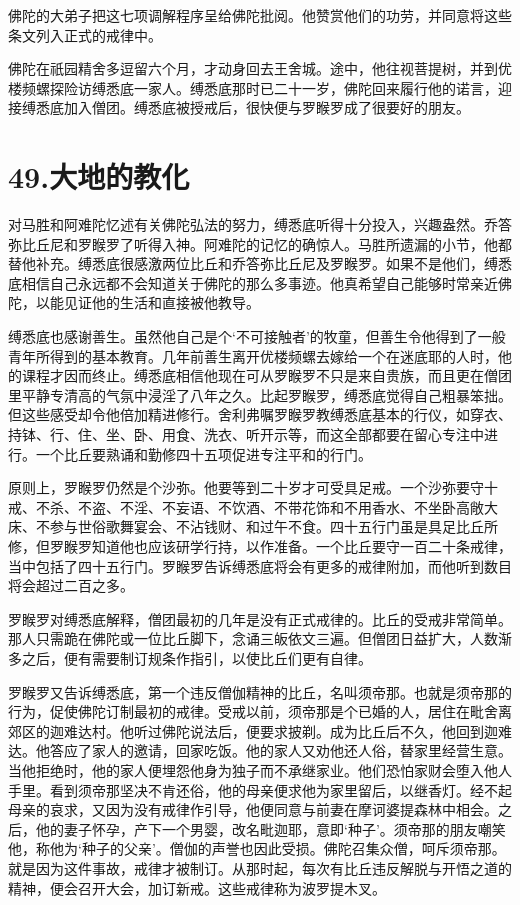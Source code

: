 \documentclass[12pt,twoside,openany]{book}
\begin{document}
佛陀的大弟子把这七项调解程序呈给佛陀批阅。他赞赏他们的功劳，并同意将这些条文列入正式的戒律中。

佛陀在祇园精舍多逗留六个月，才动身回去王舍城。途中，他往视菩提树，并到优楼频螺探险访缚悉底一家人。缚悉底那时已二十一岁，佛陀回来履行他的诺言，迎接缚悉底加入僧团。缚悉底被授戒后，很快便与罗睺罗成了很要好的朋友。


\chapter{49.大地的教化}\label{ch49}

对马胜和阿难陀忆述有关佛陀弘法的努力，缚悉底听得十分投入，兴趣盎然。乔答弥比丘尼和罗睺罗了听得入神。阿难陀的记忆的确惊人。马胜所遗漏的小节，他都替他补充。缚悉底很感激两位比丘和乔答弥比丘尼及罗睺罗。如果不是他们，缚悉底相信自己永远都不会知道关于佛陀的那么多事迹。他真希望自己能够时常亲近佛陀，以能见证他的生活和直接被他教导。

缚悉底也感谢善生。虽然他自己是个‘不可接触者’的牧童，但善生令他得到了一般青年所得到的基本教育。几年前善生离开优楼频螺去嫁给一个在迷底耶的人时，他的课程才因而终止。缚悉底相信他现在可从罗睺罗不只是来自贵族，而且更在僧团里平静专清高的气氛中浸淫了八年之久。比起罗睺罗，缚悉底觉得自己粗暴笨拙。但这些感受却令他倍加精进修行。舍利弗嘱罗睺罗教缚悉底基本的行仪，如穿衣、持钵、行、住、坐、卧、用食、洗衣、听开示等，而这全部都要在留心专注中进行。一个比丘要熟诵和勤修四十五项促进专注平和的行门。

原则上，罗睺罗仍然是个沙弥。他要等到二十岁才可受具足戒。一个沙弥要守十戒、不杀、不盗、不淫、不妄语、不饮酒、不带花饰和不用香水、不坐卧高敞大床、不参与世俗歌舞宴会、不沾钱财、和过午不食。四十五行门虽是具足比丘所修，但罗睺罗知道他也应该研学行持，以作准备。一个比丘要守一百二十条戒律，当中包括了四十五行门。罗睺罗告诉缚悉底将会有更多的戒律附加，而他听到数目将会超过二百之多。

罗睺罗对缚悉底解释，僧团最初的几年是没有正式戒律的。比丘的受戒非常简单。那人只需跪在佛陀或一位比丘脚下，念诵三皈依文三遍。但僧团日益扩大，人数渐多之后，便有需要制订规条作指引，以使比丘们更有自律。

罗睺罗又告诉缚悉底，第一个违反僧伽精神的比丘，名叫须帝那。也就是须帝那的行为，促使佛陀订制最初的戒律。受戒以前，须帝那是个已婚的人，居住在毗舍离郊区的迦难达村。他听过佛陀说法后，便要求披剃。成为比丘后不久，他回到迦难达。他答应了家人的邀请，回家吃饭。他的家人又劝他还人俗，替家里经营生意。当他拒绝时，他的家人便埋怨他身为独子而不承继家业。他们恐怕家财会堕入他人手里。看到须帝那坚决不肯还俗，他的母亲便求他为家里留后，以继香灯。经不起母亲的哀求，又因为没有戒律作引导，他便同意与前妻在摩诃婆提森林中相会。之后，他的妻子怀孕，产下一个男婴，改名毗迦耶，意即‘种子’。须帝那的朋友嘲笑他，称他为‘种子的父亲’。僧伽的声誉也因此受损。佛陀召集众僧，呵斥须帝那。就是因为这件事故，戒律才被制订。从那时起，每次有比丘违反解脱与开悟之道的精神，便会召开大会，加订新戒。这些戒律称为波罗提木叉。
\end{document}
